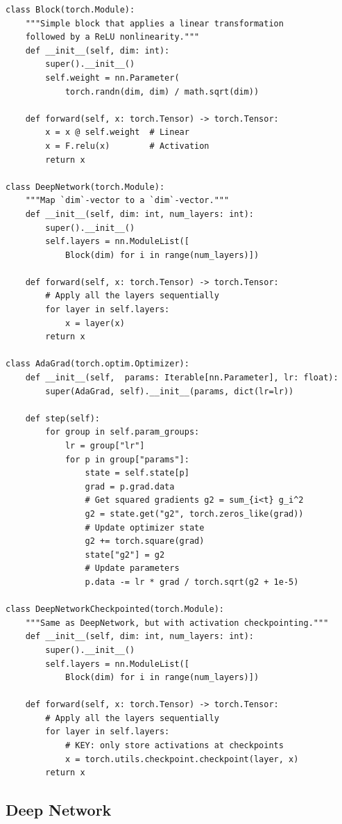 \documentclass[12pt,twoside]{article}
\begin{document}
\begin{verbatim}
class Block(torch.Module):
    """Simple block that applies a linear transformation 
    followed by a ReLU nonlinearity."""
    def __init__(self, dim: int):
        super().__init__()
        self.weight = nn.Parameter(
            torch.randn(dim, dim) / math.sqrt(dim))
    
    def forward(self, x: torch.Tensor) -> torch.Tensor:
        x = x @ self.weight  # Linear
        x = F.relu(x)        # Activation
        return x

class DeepNetwork(torch.Module):
    """Map `dim`-vector to a `dim`-vector."""
    def __init__(self, dim: int, num_layers: int):
        super().__init__()
        self.layers = nn.ModuleList([
            Block(dim) for i in range(num_layers)])
    
    def forward(self, x: torch.Tensor) -> torch.Tensor:
        # Apply all the layers sequentially
        for layer in self.layers:
            x = layer(x)  
        return x

class AdaGrad(torch.optim.Optimizer):
    def __init__(self,  params: Iterable[nn.Parameter], lr: float):
        super(AdaGrad, self).__init__(params, dict(lr=lr))
    
    def step(self):
        for group in self.param_groups:
            lr = group["lr"]
            for p in group["params"]:
                state = self.state[p]
                grad = p.grad.data
                # Get squared gradients g2 = sum_{i<t} g_i^2
                g2 = state.get("g2", torch.zeros_like(grad))
                # Update optimizer state
                g2 += torch.square(grad)
                state["g2"] = g2
                # Update parameters
                p.data -= lr * grad / torch.sqrt(g2 + 1e-5)

class DeepNetworkCheckpointed(torch.Module):
    """Same as DeepNetwork, but with activation checkpointing."""
    def __init__(self, dim: int, num_layers: int):
        super().__init__()
        self.layers = nn.ModuleList([
            Block(dim) for i in range(num_layers)])
    
    def forward(self, x: torch.Tensor) -> torch.Tensor:
        # Apply all the layers sequentially
        for layer in self.layers:
            # KEY: only store activations at checkpoints
            x = torch.utils.checkpoint.checkpoint(layer, x)  
        return x
\end{verbatim}

\subsection*{Deep Network}
\end{document}
